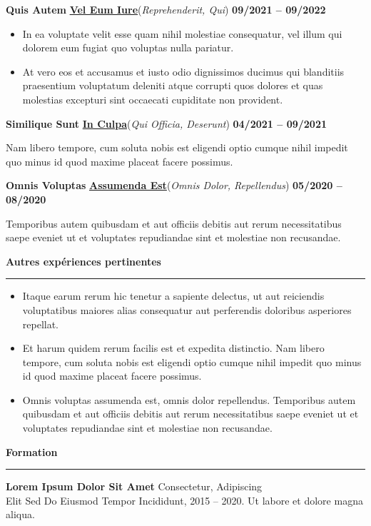 \documentclass[letterpaper]{article}
\newcommand\MyHeadings[4]{%
  \noindent \textbf{#1} \hfill\textbf{\underline{#2}}(\textit{#3}) \hfill \textbf{#4}
\par
}
\newcommand{\sectionheader}[1]{
    \vspace{8pt}
    \noindent\textbf{\large #1}
    \vspace{4pt}
    \hrule
    \vspace{6pt}
}
\begin{document}
\MyHeadings{Quis Autem}{Vel Eum Iure}{Reprehenderit, Qui}{09/2021 -- 09/2022}
\begin{itemize}
    \item In ea voluptate velit esse quam nihil molestiae consequatur, vel illum qui dolorem eum fugiat quo voluptas nulla pariatur.
    \item At vero eos et accusamus et iusto odio dignissimos ducimus qui blanditiis praesentium voluptatum deleniti atque corrupti quos dolores et quas molestias excepturi sint occaecati cupiditate non provident.
\end{itemize}

\vspace{6pt}

\MyHeadings{Similique Sunt}{In Culpa}{Qui Officia, Deserunt}{04/2021 -- 09/2021}
Nam libero tempore, cum soluta nobis est eligendi optio cumque nihil impedit quo minus id quod maxime placeat facere possimus.

\vspace{6pt}

\MyHeadings{Omnis Voluptas}{Assumenda Est}{Omnis Dolor, Repellendus}{05/2020 -- 08/2020}
Temporibus autem quibusdam et aut officiis debitis aut rerum necessitatibus saepe eveniet ut et voluptates repudiandae sint et molestiae non recusandae.

\vspace{6pt}

\sectionheader{Autres expériences pertinentes}
\begin{itemize}
    \item Itaque earum rerum hic tenetur a sapiente delectus, ut aut reiciendis voluptatibus maiores alias consequatur aut perferendis doloribus asperiores repellat.
    \item Et harum quidem rerum facilis est et expedita distinctio. Nam libero tempore, cum soluta nobis est eligendi optio cumque nihil impedit quo minus id quod maxime placeat facere possimus.
    \item Omnis voluptas assumenda est, omnis dolor repellendus. Temporibus autem quibusdam et aut officiis debitis aut rerum necessitatibus saepe eveniet ut et voluptates repudiandae sint et molestiae non recusandae.
\end{itemize}

\vspace{6pt}

\sectionheader{Formation}
\textbf{Lorem Ipsum Dolor Sit Amet} \hfill Consectetur, Adipiscing \\
Elit Sed Do Eiusmod Tempor Incididunt, 2015 -- 2020.
Ut labore et dolore magna aliqua.
\end{document}
